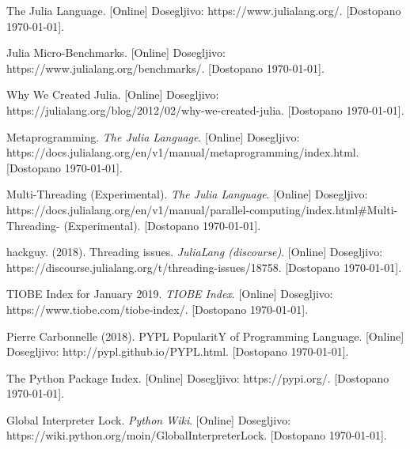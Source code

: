 \documentclass[journal,a4paper,twoside]{sty/IEEEtran}
\begin{document}
\begin{thebibliography}{99}


 The Julia Language. [Online] Dosegljivo: \mbox{https://www.julialang.org/}. [Dostopano \today].

 Julia Micro-Benchmarks. [Online] Dosegljivo: \mbox{https://www.julialang.org/benchmarks/}. [Dostopano \today].

 Why We Created Julia. [Online] Dosegljivo: \mbox{https://julialang.org/blog/2012/02/why-we-created-julia}. [Dostopano \today].

 Metaprogramming. \emph{The Julia Language}. [Online] Dosegljivo:
	https://docs.julialang.org/\allowbreak en/v1/manual/\allowbreak metaprogramming/index.html. [Dostopano \today].
	
 Multi-Threading (Experimental). \emph{The Julia Language}. [Online] Dosegljivo:
	https://docs.julialang.org/\allowbreak en/v1/\allowbreak manual/parallel-computing/\allowbreak index.html\allowbreak \#Multi-Threading-
	(Experimental). [Dostopano \today].

 hackguy. (2018). Threading issues. \emph{JuliaLang (discourse)}. [Online] Dosegljivo:
	https://discourse.julialang.org/t/threading-issues/18758. [Dostopano \today].

 TIOBE Index for January 2019. \emph{TIOBE Index}. [Online] Dosegljivo: https://www.tiobe.com/tiobe-index/. [Dostopano \today].

 Pierre Carbonnelle (2018). PYPL PopularitY of Programming Language. [Online] Dosegljivo: http://pypl.github.io/PYPL.html.
	[Dostopano \today].

 The Python Package Index. [Online] Dosegljivo: https://pypi.org/. [Dostopano \today].

 Global Interpreter Lock. \emph{Python Wiki}. [Online] Dosegljivo: https://wiki.python.org/moin/GlobalInterpreterLock.
	[Dostopano \today].

\end{thebibliography}

\end{document}
